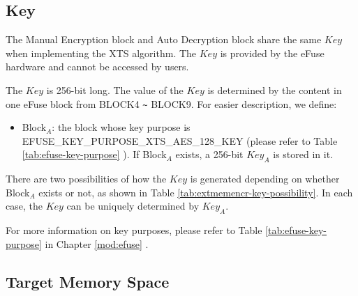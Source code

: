 \documentclass[main\_\_EN.tex]{subfiles}
\begin{document}
\subsection{Key} 
\label{sec:extmemncr-key}

The Manual Encryption block and Auto Decryption block share the same \begin{math}\mathit{Key}\end{math} when implementing the XTS algorithm. The \begin{math}\mathit{Key}\end{math} is provided by the eFuse hardware and cannot be accessed by users.

The \begin{math}\mathit{Key}\end{math} is 256-bit long. The value of the \begin{math}\mathit{Key}\end{math} is determined by the content in one eFuse block from BLOCK4 \verb+~+ BLOCK9. For easier description, we define:
\begin{itemize}
\item Block$_A$: the block whose key purpose is EFUSE\_KEY\_PURPOSE\_XTS\_AES\_128\_KEY (please refer to Table \ref{tab:efuse-key-purpose} \textit{}). If Block$_A$ exists, a 256-bit \begin{math}\mathit{Key}_{A}\end{math} is stored in it.
\end{itemize}

There are two possibilities of how the \begin{math}\mathit{Key}\end{math} is generated depending on whether Block$_A$ exists or not, as shown in Table \ref{tab:extmemencr-key-possibility}. In each case, the \begin{math}\mathit{Key}\end{math} can be uniquely determined by \begin{math}\mathit{Key}_{A}\end{math}.



For more information on key purposes, please refer to Table \ref{tab:efuse-key-purpose} \textit{} in Chapter \ref{mod:efuse} \textit{}.

\subsection{Target Memory Space} 
\label{sec:extmemencr-target-space}
\end{document}
